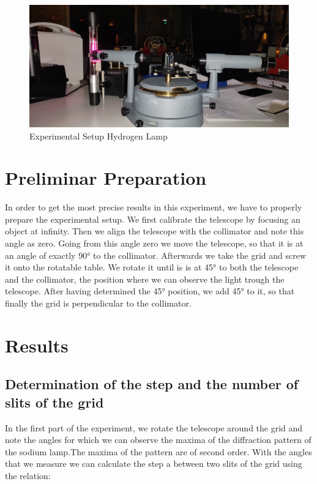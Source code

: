 \documentclass{scrartcl}
\begin{document}
\begin{figure}[h]
    \centering
    \includegraphics[scale=0.2]{TP7_ExSetup.jpeg}
    \caption{Experimental Setup Hydrogen Lamp}
    \label{fig:2}
\end{figure}


\section{Preliminar Preparation}

In order to get the most precise results in this experiment, we have to properly prepare the experimental setup.
We first calibrate the telescope by focusing an object at infinity. Then we align the telescope with the collimator and note this angle as zero. Going from this angle zero we move the telescope, so that it is at an angle of exactly 90° to the collimator. Afterwards we take the grid and screw it onto the rotatable table. We rotate it until is is at 45° to both the telescope and the collimator, the position where we can observe the light trough the telescope. After having determined the 45° position, we add 45° to it, so that finally the grid is perpendicular to the collimator. 

\section{Results}

\subsection{Determination of the step and the number of slits of the grid}

In the first part of the experiment, we rotate the telescope around the grid and note the angles for which we can observe the maxima of the diffraction pattern of the sodium lamp.The maxima of the pattern are of second order. With the angles that we measure we can calculate the step a between two slits of the grid using the relation:
\end{document}
